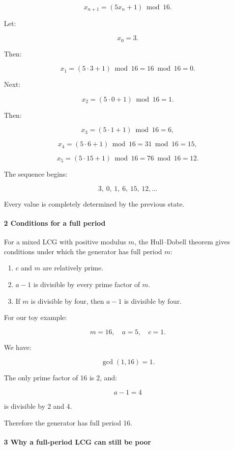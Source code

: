 \[
 x_{n+1}=(5x_n+1)\bmod16.
\]

Let:

\[
 x_0=3.
\]

Then:

\[
 x_1=(5\cdot3+1)\bmod16=16\bmod16=0.
\]

Next:

\[
 x_2=(5\cdot0+1)\bmod16=1.
\]

Then:

\[
 x_3=(5\cdot1+1)\bmod16=6,
\]

\[
 x_4=(5\cdot6+1)\bmod16=31\bmod16=15,
\]

\[
 x_5=(5\cdot15+1)\bmod16=76\bmod16=12.
\]

The sequence begins:

\[
 3,\ 0,\ 1,\ 6,\ 15,\ 12,\ldots
\]

Every value is completely determined by the previous state.

\paragraph{2 Conditions for a full period}\label{conditions-for-a-full-period}

For a mixed LCG with positive modulus \(m\), the Hull--Dobell theorem gives conditions under which the generator has full period \(m\):

\begin{enumerate}
\def\labelenumi{\arabic{enumi}.}
\tightlist
\item
  \(c\) and \(m\) are relatively prime.
\item
  \(a-1\) is divisible by every prime factor of \(m\).
\item
  If \(m\) is divisible by four, then \(a-1\) is divisible by four.
\end{enumerate}

For our toy example:

\[
 m=16,\quad a=5,\quad c=1.
\]

We have:

\[
 \gcd(1,16)=1.
\]

The only prime factor of 16 is 2, and:

\[
 a-1=4
\]

is divisible by 2 and 4.

Therefore the generator has full period 16.

\paragraph{3 Why a full-period LCG can still be poor}\label{why-a-full-period-lcg-can-still-be-poor}


